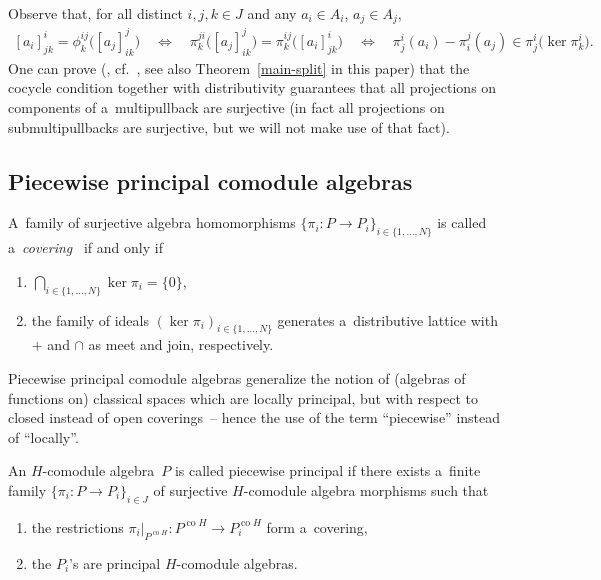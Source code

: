 \documentclass[pdftex]{sigma}
\DeclareMathOperator{\co}{co}
\begin{document}
Observe that, for all distinct $i,j,k\in J$ and any $a_i\in A_i$, $a_j\in A_j$,
\begin{gather}
\label{eqphi}
[a_i]^i_{jk}=\phi^{ij}_k\big([a_j]^j_{ik}\big)
\quad\!
\Leftrightarrow
\quad\!
\pi^{ji}_k\big([a_j]^j_{ik}\big)=\pi^{ij}_k\big([a_i]^{i}_{jk}\big)
\quad\!
\Leftrightarrow
\quad\!
\pi^i_j(a_i)-\pi^j_i(a_j)\in\pi^i_j\big(\ker\pi^i_k\big).\!\!\!
\end{gather}
One can prove (\cite{CM2000}, cf.~\cite{cocycle}, see also Theorem~\ref{main-split} in this paper) that the cocycle
condition together with distributivity guarantees that all projections on components of a~multipullback are surjective
(in fact all projections on submultipullbacks are surjective, but we will not make use of that fact).

\subsection{Piecewise principal comodule algebras}

\begin{definition} A~family of surjective algebra homomorphisms  $\{\pi_i:P\rightarrow P_i\}_{i\in\{1,\ldots,N\}}$
is called a~{\em covering}~\cite{hkmz11} if and only if
\begin{enumerate}\itemsep=0pt
\item[1)] $\bigcap_{i\in\{1,\ldots,N\}}\ker\pi_i=\{0\}$,
\item[2)] the family of ideals $(\ker\pi_i)_{i\in\{1,\ldots,N\}}$ generates a~distributive lattice with $+$ and $\cap$ as
meet and join, respectively.
\end{enumerate}
\end{definition}

Piecewise principal comodule algebras generalize the notion of (algebras of functions on) classical spaces which are
locally principal, but with respect to closed instead of open coverings~-- hence the use of the term ``piecewise''
instead of ``locally''.

\begin{definition}\label{piecewise-principal-def}
An $H$-comodule algebra~$P$ is called piecewise principal if there exists a~f\/inite
family $\{\pi_i:P\rightarrow P_i\}_{i\in J}$ of surjective $H$-comodule algebra morphisms such that
\begin{enumerate}\itemsep=0pt
\item[1)] the restrictions $\pi_i\big|_{P^{\co H}}:P^{\co H}\rightarrow P^{\co H}_i$ form a~covering,
\item[2)] the $P_i$'s are principal $H$-comodule algebras.
\end{enumerate}
\end{definition}
\end{document}
